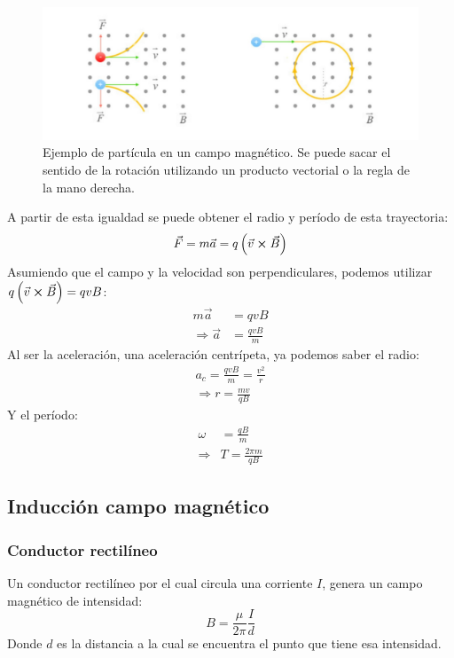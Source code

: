 \documentclass[arial,a4paper,print]{article}
\begin{document}
\begin{figure}[H]
	\centering
	\includegraphics[width=0.7\linewidth]{figures/particula_con_B}
	\caption{Ejemplo de partícula en un campo magnético. Se puede sacar el sentido de la rotación utilizando un producto vectorial o la regla de la mano derecha. }
	\label{fig:particulaconb}
\end{figure}

A partir de esta igualdad se puede obtener el radio y período de esta trayectoria:
\begin{align*}
	\vec{F} = m\vec{a} &= q\left(\vec{v}\cross\vec{B}\right)  \\
\end{align*}
Asumiendo que el campo y la velocidad son perpendiculares, podemos utilizar $q\left(\vec{v}\cross\vec{B}\right) = qvB$:
\begin{align*}
	m\vec{a} &= qvB \\
	\Rightarrow \vec{a} &= \frac{qvB}{m}
\end{align*}
Al ser la aceleración, una aceleración centrípeta, ya podemos saber el radio:
\begin{align*}
	a_{c} = \frac{qvB}{m} = \frac{v^{2}}{r} \\
	\Rightarrow r = \frac{mv}{qB}
\end{align*}
Y el período:
\begin{align*}
	\omega &= \frac{qB}{m} \\
	\Rightarrow & T = \frac{2\pi m}{qB}
\end{align*}

\subsection{Inducción campo magnético}
\subsubsection{Conductor rectilíneo}
Un conductor rectilíneo por el cual circula una corriente $I$, genera un campo magnético de intensidad:
\begin{equation*}
	B=\frac{\mu}{2\pi}\frac{I}{d}
\end{equation*}
Donde $d$ es la distancia a la cual se encuentra el punto que tiene esa intensidad. 
\end{document}
